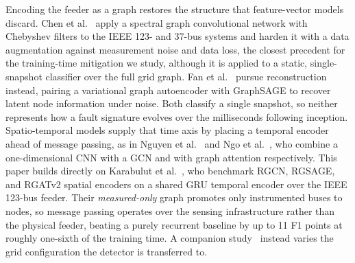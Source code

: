 \documentclass[3p,times,procedia]{elsarticle}
\begin{document}
Encoding the feeder as a graph restores the structure that feature-vector models discard. Chen et al.~\cite{chen2020} apply a spectral graph convolutional network with Chebyshev filters to the IEEE 123- and 37-bus systems and harden it with a data augmentation against measurement noise and data loss, the closest precedent for the training-time mitigation we study, although it is applied to a static, single-snapshot classifier over the full grid graph. Fan et al.~\cite{fan2024} pursue reconstruction instead, pairing a variational graph autoencoder with GraphSAGE to recover latent node information under noise. Both classify a single snapshot, so neither represents how a fault signature evolves over the milliseconds following inception. Spatio-temporal models supply that time axis by placing a temporal encoder ahead of message passing, as in Nguyen et al.~\cite{nguyen2022} and Ngo et al.~\cite{ngo2025}, who combine a one-dimensional CNN with a GCN and with graph attention respectively. This paper builds directly on Karabulut et al.~\cite{Karabulut2026}, who benchmark RGCN, RGSAGE, and RGATv2 spatial encoders on a shared GRU temporal encoder over the IEEE 123-bus feeder. Their \emph{measured-only} graph promotes only instrumented buses to nodes, so message passing operates over the sensing infrastructure rather than the physical feeder, beating a purely recurrent baseline by up to 11 F1 points at roughly one-sixth of the training time. A companion study~\cite{Karabulut2025} instead varies the grid configuration the detector is transferred to.
\end{document}
